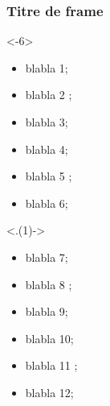 \documentclass[14pt,c]{beamer}
\begin{document}
\begin{frame}
    \frametitle{Titre de frame}

    \begin{onlyenv}<-6>
        \begin{itemize}
            \item blabla 1; 
            \item  blabla 2 ;
            \item blabla 3;
            \item blabla 4; 
            \item  blabla 5 ;
            \item blabla 6;
         \end{itemize}
     \end{onlyenv}

     \begin{onlyenv}<.(1)->
         \begin{itemize}
            \item blabla 7; 
            \item  blabla 8 ;
            \item blabla 9;
            \item blabla 10; 
            \item  blabla 11 ;
            \item blabla 12;
        \end{itemize}
    \end{onlyenv}

\end{frame}
\end{document}
